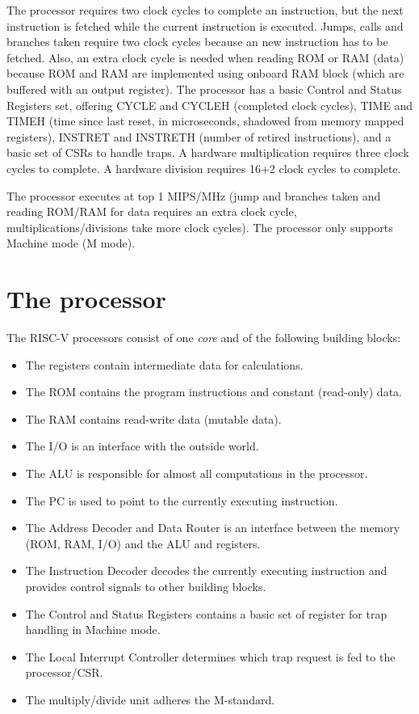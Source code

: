 \documentclass[12pt]{article}
\begin{document}
The processor requires two clock cycles to complete an instruction, but the next instruction is fetched while the current instruction is executed. Jumps, calls and branches taken require two clock cycles because an new instruction has to be fetched. Also, an extra clock cycle is needed when reading ROM or RAM (data) because ROM and RAM are implemented using onboard RAM block (which are buffered with an output register). The processor has a basic Control and Status Registers set, offering CYCLE and CYCLEH (completed clock cycles), TIME and TIMEH (time since last reset, in microseconds, shadowed from memory mapped registers), INSTRET and INSTRETH (number of retired instructions), and a basic set of CSRs to handle traps. A hardware multiplication requires three clock cycles to complete. A hardware division requires 16+2 clock cycles to complete.

The processor executes at top 1 MIPS/MHz (jump and branches taken and reading ROM/RAM for data requires an extra clock cycle, multiplications/divisions take more clock cycles). 
The processor only supports Machine mode (M mode).

\section{The processor}
The RISC-V processors consist of one \textit{core} and of the following building blocks:

\begin{itemize}
\item The registers contain intermediate data for calculations.
\item The ROM contains the program instructions and constant (read-only) data.
\item The RAM contains read-write data (mutable data).
\item The I/O is an interface with the outside world.
\item The ALU is responsible for almost all computations in the processor.
\item The PC is used to point to the currently executing instruction.
\item The Address Decoder and Data Router is an interface between the memory (ROM, RAM, I/O) and the ALU and registers.
\item The Instruction Decoder decodes the currently executing instruction and provides control signals to other building blocks.
\item The Control and Status Registers contains a basic set of register for trap handling in Machine mode.
\item The Local Interrupt Controller determines which trap request is fed to the processor/CSR.
\item The multiply/divide unit adheres the M-standard.
\end{itemize}
\end{document}
